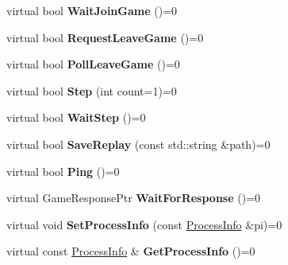 \begin{DoxyCompactItemize}
virtual bool {\bfseries Wait\+Join\+Game} ()=0
\item 
\mbox{\label{classsc2_1_1_control_interface_ab4fbb92be4e178ab662770155c7b0cd0}} 
virtual bool {\bfseries Request\+Leave\+Game} ()=0
\item 
\mbox{\label{classsc2_1_1_control_interface_a9858c7bc4cf9485e958d96e518bd5268}} 
virtual bool {\bfseries Poll\+Leave\+Game} ()=0
\item 
\mbox{\label{classsc2_1_1_control_interface_ac4051c302ac0aff7892b7b3dac834bff}} 
virtual bool {\bfseries Step} (int count=1)=0
\item 
\mbox{\label{classsc2_1_1_control_interface_afdceac1202a0160a4bb8bcea6ab227c1}} 
virtual bool {\bfseries Wait\+Step} ()=0
\item 
\mbox{\label{classsc2_1_1_control_interface_a3e9f1c13939a03abccfc73191cc7fdcf}} 
virtual bool {\bfseries Save\+Replay} (const std\+::string \&path)=0
\item 
\mbox{\label{classsc2_1_1_control_interface_a98c730f6414edaa5166890dede1fe83c}} 
virtual bool {\bfseries Ping} ()=0
\item 
\mbox{\label{classsc2_1_1_control_interface_a02fe1bf89ffb788392bf7707ba9fc049}} 
virtual Game\+Response\+Ptr {\bfseries Wait\+For\+Response} ()=0
\item 
\mbox{\label{classsc2_1_1_control_interface_a869db0749b2f5db41731886cc7fe9d87}} 
virtual void {\bfseries Set\+Process\+Info} (const \hyperlink{structsc2_1_1_process_info}{Process\+Info} \&pi)=0
\item 
\mbox{\label{classsc2_1_1_control_interface_a0c3749bc57d64e1d37f37f0d3d16ec62}} 
virtual const \hyperlink{structsc2_1_1_process_info}{Process\+Info} \& {\bfseries Get\+Process\+Info} ()=0
\item 
\mbox{\label{classsc2_1_1_control_interface_a7856754a90ef19fce1c37d532940cc70}} 

\end{DoxyCompactItemize}
